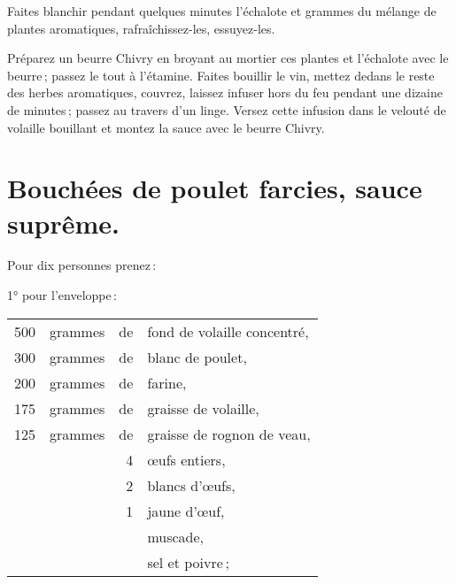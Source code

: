 Faites blanchir pendant quelques minutes l'échalote et {\mmm} grammes du mélange de
plantes aromatiques, rafraîchissez-les, essuyez-les.

Préparez un beurre Chivry en broyant au mortier ces plantes et l'échalote avec
le beurre ; passez le tout à l'étamine. Faites bouillir le vin, mettez dedans
le reste des herbes aromatiques, couvrez, laissez infuser hors du feu pendant
une dizaine de minutes ; passez au travers d’un linge. Versez cette infusion
dans le velouté de volaille bouillant et montez la sauce avec le beurre Chivry.

\section*{\centering Bouchées de poulet farcies, sauce suprême.}
{}

Pour dix personnes prenez :

\smallskip

1° pour l'enveloppe :

\smallskip

\footnotesize
\begin{longtable}{rrrp{16em}}
    500 & grammes & de & fond de volaille concentré,                                                      \\
    300 & grammes & de & blanc de poulet,                                                                 \\
    200 & grammes & de & farine,                                                                          \\
    175 & grammes & de & graisse de volaille,                                                             \\
    125 & grammes & de & graisse de rognon de veau,                                                       \\
        &         &  4 & œufs entiers,                                                                    \\
        &         &  2 & blancs d'œufs,                                                                   \\
        &         &  1 & jaune d'œuf,                                                                     \\
        &         &    & muscade,                                                                         \\
        &         &    & sel et poivre ;                                                                  \\
\end{longtable}
\normalsize

